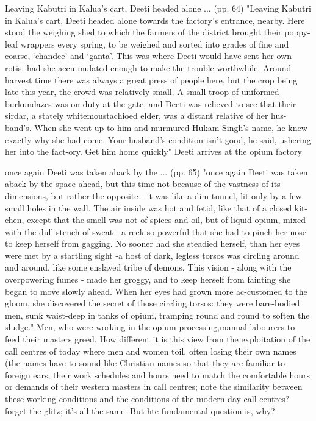 Leaving Kabutri in Kalua’s cart, Deeti headed alone ... (pp. 64)
"Leaving Kabutri in Kalua’s cart, Deeti headed alone towards the factory’s entrance, nearby. Here stood the weighing shed to which the farmers of the district brought their poppy-leaf wrappers every spring, to be weighed and sorted into grades of fine and coarse, ‘chandee’ and ‘ganta’. This was where Deeti would have sent her own rotis, had she accu-mulated enough to make the trouble worthwhile. Around harvest time there was always a great press of people here, but the crop being late this year, the crowd was relatively small. A small troop of uniformed burkundazes was on duty at the gate, and Deeti was relieved to see that their sirdar, a stately whitemoustachioed elder, was a distant relative of her hus-band’s. When she went up to him and murmured Hukam Singh’s name, he knew exactly why she had come. Your husband’s condition isn’t good, he said, ushering her into the fact-ory. Get him home quickly"
Deeti arrives at the opium factory

once again Deeti was taken aback by the ... (pp. 65)
"once again Deeti was taken aback by the space ahead, but this time not because of the vastness of its dimensions, but rather the opposite - it was like a dim tunnel, lit only by a few small holes in the wall. The air inside was hot and fetid, like that of a closed kit-chen, except that the smell was not of spices and oil, but of liquid opium, mixed with the dull stench of sweat - a reek so powerful that she had to pinch her nose to keep herself from gagging. No sooner had she steadied herself, than her eyes were met by a startling sight -a host of dark, legless torsos was circling around and around, like some enslaved tribe of demons. This vision - along with the overpowering fumes - made her groggy, and to keep herself from fainting she began to move slowly ahead. When her eyes had grown more ac-customed to the gloom, she discovered the secret of those circling torsos: they were bare-bodied men, sunk waist-deep in tanks of opium, tramping round and round to soften the sludge."
Men, who were working in the opium processing,manual labourers to feed their masters greed. How different it is this view from the exploitation of the call centres of today where men and women toil, often losing their own names (the names have to sound like Christian names so that they are familiar to foreign ears; their work schedules and hours need to match the comfortable hours or demands of their western masters in call centres; note the similarity between these working conditions and the conditions of the modern day call centres? forget the glitz; it's all the same. But hte fundamental question is, why?

